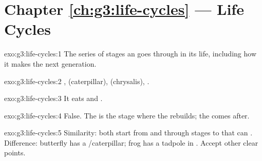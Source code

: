 \section*{Chapter \ref{ch:g3:life-cycles} --- Life Cycles}

\begin{solution}{exo:g3:life-cycles:1}
The series of stages an  goes through in its life, including
how it makes the next generation.
\end{solution}

\begin{solution}{exo:g3:life-cycles:2}
,  (caterpillar),  (chrysalis), .
\end{solution}

\begin{solution}{exo:g3:life-cycles:3}
It eats and .
\end{solution}

\begin{solution}{exo:g3:life-cycles:4}
False. The  is the stage where the  rebuilds; the 
comes after.
\end{solution}

\begin{solution}{exo:g3:life-cycles:5}
Similarity: both start from  and  through stages to 
that can . Difference: butterfly has a /caterpillar;
frog has a tadpole in . Accept other clear points.
\end{solution}

